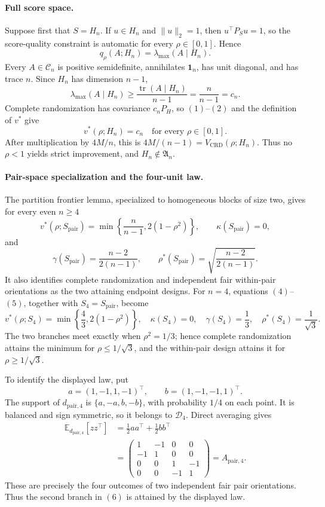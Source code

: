 \paragraph{Full score space.}
Suppose first that \(S=H_n\).  If \(u\in H_n\) and \(\|u\|_2=1\), then \(u^\top P_Su=1\), so the score-quality constraint is automatic for every \(\rho\in[0,1]\).  Hence
\[
q_\rho(A;H_n)=\lambda_{\max}(A\mid H_n).
\tag{1}
\]
Every \(A\in\mathcal C_n\) is positive semidefinite, annihilates \(\mathbf 1_n\), has unit diagonal, and has trace \(n\).  Since \(H_n\) has dimension \(n-1\),
\[
\lambda_{\max}(A\mid H_n)
\geq\frac{\operatorname{tr}(A\mid H_n)}{n-1}
=\frac{n}{n-1}=c_n.
\tag{2}
\]
Complete randomization has covariance \(c_nP_H\), so \((1)\)--\((2)\) and the definition of \(v^*\) give
\[
v^*(\rho;H_n)=c_n
\quad\text{for every }\rho\in[0,1].
\tag{3}
\]
After multiplication by \(4M/n\), this is \(4M/(n-1)=V_{\mathrm{CRD}}(\rho;H_n)\).  Thus no \(\rho<1\) yields strict improvement, and \(H_n\notin\mathfrak A_n\).

\paragraph{Pair-space specialization and the four-unit law.}
The partition frontier lemma, specialized to homogeneous blocks of size two, gives for every even \(n\geq4\)
\[
v^*(\rho;S_{\mathrm{pair}})
=\min\left\{\frac{n}{n-1},2(1-\rho^2)\right\},
\qquad
\kappa(S_{\mathrm{pair}})=0,
\tag{4}
\]
and
\[
\gamma(S_{\mathrm{pair}})=\frac{n-2}{2(n-1)},
\qquad
\rho^*(S_{\mathrm{pair}})
=\sqrt{\frac{n-2}{2(n-1)}}.
\tag{5}
\]
It also identifies complete randomization and independent fair within-pair orientations as the two attaining endpoint designs.  For \(n=4\), equations \((4)\)--\((5)\), together with \(S_4=S_{\mathrm{pair}}\), become
\[
v^*(\rho;S_4)=\min\left\{\frac43,2(1-\rho^2)\right\},
\quad
\kappa(S_4)=0,
\quad
\gamma(S_4)=\frac13,
\quad
\rho^*(S_4)=\frac1{\sqrt3}.
\tag{6}
\]
The two branches meet exactly when \(\rho^2=1/3\); hence complete randomization attains the minimum for \(\rho\leq1/\sqrt3\), and the within-pair design attains it for \(\rho\geq1/\sqrt3\).

To identify the displayed law, put
\[
a=(1,-1,1,-1)^\top,
\qquad
b=(1,-1,-1,1)^\top.
\]
The support of \(d_{\mathrm{pair},4}\) is \(\{a,-a,b,-b\}\), with probability \(1/4\) on each point.  It is balanced and sign symmetric, so it belongs to \(\mathcal D_4\).  Direct averaging gives
\[
\begin{aligned}
\mathbb E_{d_{\mathrm{pair},4}}[zz^\top]
&=\frac12aa^\top+\frac12bb^\top\\
&=
\begin{pmatrix}
1&-1&0&0\\
-1&1&0&0\\
0&0&1&-1\\
0&0&-1&1
\end{pmatrix}
=A_{\mathrm{pair},4}.
\end{aligned}
\tag{7}
\]
These are precisely the four outcomes of two independent fair pair orientations.  Thus the second branch in \((6)\) is attained by the displayed law.

